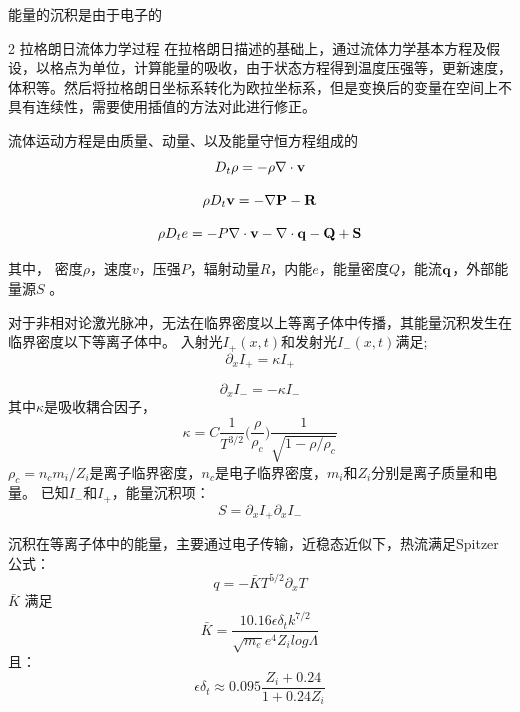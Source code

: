 能量的沉积是由于电子的

2 拉格朗日流体力学过程
在拉格朗日描述的基础上，通过流体力学基本方程及假设，以格点为单位，计算能量的吸收，由于状态方程得到温度压强等，更新速度，体积等。然后将拉格朗日坐标系转化为欧拉坐标系，但是变换后的变量在空间上不具有连续性，需要使用插值的方法对此进行修正。


流体运动方程是由质量、动量、以及能量守恒方程组成的
\begin{equation}
\label{eqn:massCon}
D_t \rho = - \rho \nabla \cdot \bf{v}
\end{equation} 

\begin{equation}
\label{eqn:momentumCon}
\rho D_t \bf{v} = - \nabla P - \bf{R}
\end{equation} 

\begin{equation}
\label{eqn:energyCon}
\rho D_t e = -P \nabla \cdot \bf{v} - \nabla \cdot \bf{q} -Q +S
\end{equation} 

其中， 密度$\rho$，速度$v$，压强$P$，辐射动量$R$，内能$e$，能量密度$Q$，能流$\bf{q}$，外部能量源$S$ 。


对于非相对论激光脉冲，无法在临界密度以上等离子体中传播，其能量沉积发生在临界密度以下等离子体中。
入射光$I_{+}(x,t)$和发射光$I_{-}(x,t)$满足;
\begin{equation}
\label{eqn:incidentLaser}
\partial_x I_{+}= \kappa I_{+}
\end{equation} 

\begin{equation}
\label{eqn:reflectLaser}
\partial_x I_{-}= -\kappa I_{-}
\end{equation} 
其中$\kappa$是吸收耦合因子，
\begin{equation}
\label{eqn:Kappa}
\kappa =C \frac{1}{T^{3/2}} \bigl( \frac{\rho}{\rho_c}  \bigr) \frac{1}{\sqrt{1-\rho/ \rho_c}}
\end{equation} 
$\rho_c=n_c m_i / Z_i$是离子临界密度，$n_c$是电子临界密度，$m_i$和$Z_i$分别是离子质量和电量。
已知$I_-$和$I_+$，能量沉积项：
\begin{equation}
\label{eqn:energyDeposition}
S=\partial_x I_+ \partial_x I_-
\end{equation} 



沉积在等离子体中的能量，主要通过电子传输，近稳态近似下，热流满足Spitzer公式：
\begin{equation}
\label{eqn:heatFlux}
q=-\bar{K} T^{5/2} {\partial}_x T
\end{equation} 
$\bar{K}$ 满足
\begin{equation}
\label{eqn:kBar}
\bar{K}=\frac{10.16 \epsilon \delta_t k^{7/2}}{\sqrt{m_e}e^4 Z_i log \Lambda}
\end{equation} 
且：
\begin{equation}
\label{eqn:heatFlux1}
\epsilon \delta_t \approx 0.095 \frac{Z_i+0.24}{1+0.24Z_i}
\end{equation} 


